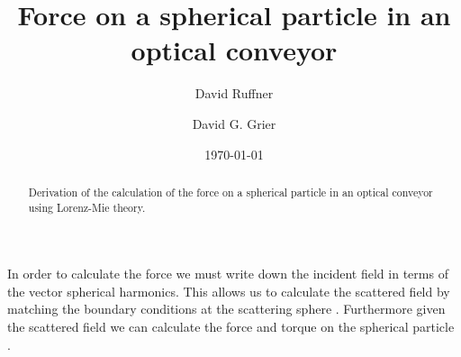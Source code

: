 \documentclass[aps,prl,twocolumn]{revtex4-1}
\begin{document}
 

\title{Force on a spherical particle in an optical conveyor}

\author{David Ruffner}
\author{David G. Grier}

\date{\today}
\begin{abstract}
  Derivation of the calculation of the force on a spherical particle
in an optical conveyor using Lorenz-Mie theory. 




\end{abstract}



\maketitle 

In order to calculate the force we must write down the incident field 
in terms of the vector spherical harmonics. This allows us to calculate
the scattered field by matching the boundary conditions at the scattering
sphere
\cite{barton_internal_1988}. Furthermore given the scattered field we
can calculate the force and torque on the spherical particle 
\cite{barton_theoretical_1989}. 
\end{document}
